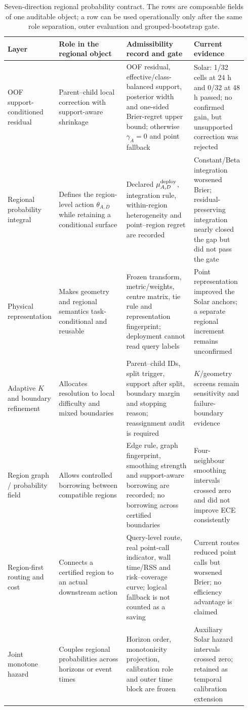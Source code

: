 \documentclass[11pt,a4paper]{article}
\numberwithin{equation}{section}
\theoremstyle{definition}\newtheorem{definition}[theorem]{Definition}
\theoremstyle{remark}\newtheorem{remark}[theorem]{Remark}
\begin{document}
\begin{table}[H]
\centering
\small
\setlength{\tabcolsep}{3pt}
\renewcommand{\arraystretch}{1.12}
\begin{tabularx}{\linewidth}{L{0.18\linewidth}L{0.28\linewidth}L{0.28\linewidth}L{0.20\linewidth}}
\toprule
Layer & Role in the regional object & Admissibility record and gate & Current evidence\\
\midrule
OOF support-conditioned residual & Parent--child local correction with support-aware shrinkage & OOF residual, effective/class-balanced support, posterior width and one-sided Brier-regret upper bound; otherwise $\gamma_A=0$ and point fallback & Solar: 1/32 cells at 24 h and 0/32 at 48 h passed; no confirmed gain, but unsupported correction was rejected\\
Regional probability integral & Defines the region-level action $\theta_{A,D}$ while retaining a conditional surface & Declared $\mu_{A,D}^{\rm deploy}$, integration rule, within-region heterogeneity and point--region regret are recorded & Constant/Beta integration worsened Brier; residual-preserving integration nearly closed the gap but did not pass the gate\\
Physical representation & Makes geometry and regional semantics task-conditional and reusable & Frozen transform, metric/weights, centre matrix, tie rule and representation fingerprint; deployment cannot read query labels & Point representation improved the Solar anchors; a separate regional increment remains unconfirmed\\
Adaptive $K$ and boundary refinement & Allocates resolution to local difficulty and mixed boundaries & Parent--child IDs, split trigger, support after split, boundary margin and stopping reason; reassignment audit is required & $K$/geometry screens remain sensitivity and failure-boundary evidence\\
Region graph / probability field & Allows controlled borrowing between compatible regions & Edge rule, graph fingerprint, smoothing strength and support-aware borrowing are recorded; no borrowing across certified boundaries & Four-neighbour smoothing intervals crossed zero and did not improve ECE consistently\\
Region-first routing and cost & Connects a certified region to an actual downstream action & Query-level route, real point-call indicator, wall time/RSS and risk--coverage curve; logical fallback is not counted as a saving & Current routes reduced point calls but worsened Brier; no efficiency advantage is claimed\\
Joint monotone hazard & Couples regional probabilities across horizons or event times & Horizon order, monotonicity projection, calibration role and outer time block are frozen & Auxiliary Solar hazard intervals crossed zero; retained as temporal calibration extension\\
\bottomrule
\end{tabularx}
\caption{Seven-direction regional probability contract. The rows are composable fields of one auditable object; a row can be used operationally only after the same role separation, outer evaluation and grouped-bootstrap gate.}
\label{tab:seven_direction_contract}
\end{table}
\end{document}
